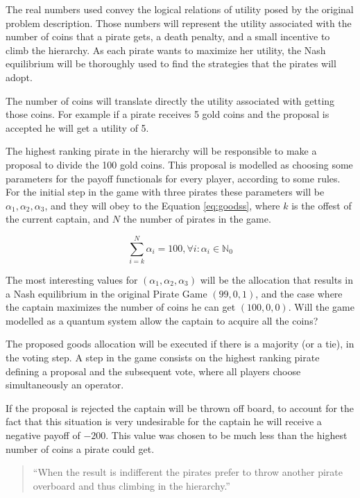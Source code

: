 The real numbers used convey the logical relations of utility posed by the original problem description. Those numbers will represent the utility associated with the number of coins that a pirate gets, a death penalty, and a small incentive to climb the hierarchy. As each pirate wants to maximize her utility, the Nash equilibrium will be thoroughly used to find the strategies that the pirates will adopt\cite{nash50}\cite{Nash51}.

The number of coins will translate directly the utility associated with getting those coins. For example if a pirate receives 5 gold coins and the proposal is accepted he will get a utility of 5. 

The highest ranking pirate in the hierarchy will be responsible to make a proposal to divide the 100 gold coins. This proposal is modelled as choosing some parameters for the payoff functionals for every player, according to some rules. For the initial step in the game with three pirates these parameters will be $\alpha_{1}, \alpha_{2}, \alpha_{3}$, and they will obey to the Equation \ref{eq:goodss}, where $k$ is the offest of the current captain, and $N$ the number of pirates in the game. 

\begin{equation}
\label{eq:goodss}
\sum_{i=k}^{N}\alpha_{i}=100, \forall i :\alpha_{i}\in\mathbb{N}_{0}
\end{equation}

The most interesting values for $(\alpha_{1}, \alpha_{2}, \alpha_{3})$ will be the allocation that results in a Nash equilibrium in the original Pirate Game $(99, 0, 1)$, and the case where the captain maximizes the number of coins he can get $(100, 0, 0)$. Will the game modelled as a quantum system allow the captain to acquire all the coins?

The proposed goods allocation will be executed if there is a majority (or a tie), in the voting step. A step in the game consists on the highest ranking pirate defining a proposal and the subsequent vote, where all players choose simultaneously an operator. 

If the proposal is rejected the captain will be thrown off board, to account for the fact that this situation is very undesirable for the captain he will receive a negative payoff of $-200$. This value was chosen to be much less than the highest number of coins a pirate could get.

\begin{quotation}
``When the result is indifferent the pirates prefer to throw another pirate overboard and thus climbing in the hierarchy.''
\end{quotation}

